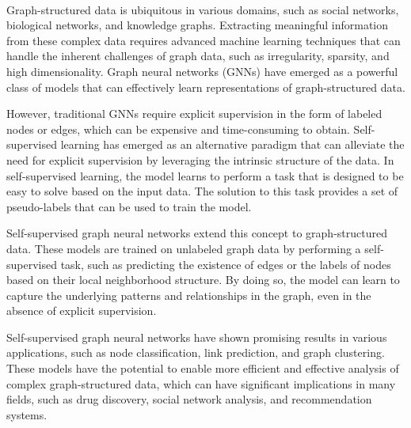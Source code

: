 \documentclass[a4paper,11pt]{report}
\begin{document}
\paragraph{}Graph-structured data is ubiquitous in various domains, such as social networks, biological networks, and knowledge graphs. Extracting meaningful information from these complex data requires advanced machine learning techniques that can handle the inherent challenges of graph data, such as irregularity, sparsity, and high dimensionality. Graph neural networks (GNNs) have emerged as a powerful class of models that can effectively learn representations of graph-structured data.

However, traditional GNNs require explicit supervision in the form of labeled nodes or edges, which can be expensive and time-consuming to obtain. Self-supervised learning has emerged as an alternative paradigm that can alleviate the need for explicit supervision by leveraging the intrinsic structure of the data. In self-supervised learning, the model learns to perform a task that is designed to be easy to solve based on the input data. The solution to this task provides a set of pseudo-labels that can be used to train the model.

Self-supervised graph neural networks extend this concept to graph-structured data. These models are trained on unlabeled graph data by performing a self-supervised task, such as predicting the existence of edges or the labels of nodes based on their local neighborhood structure. By doing so, the model can learn to capture the underlying patterns and relationships in the graph, even in the absence of explicit supervision.

Self-supervised graph neural networks have shown promising results in various applications, such as node classification, link prediction, and graph clustering. These models have the potential to enable more efficient and effective analysis of complex graph-structured data, which can have significant implications in many fields, such as drug discovery, social network analysis, and recommendation systems.
  
\end{document}
